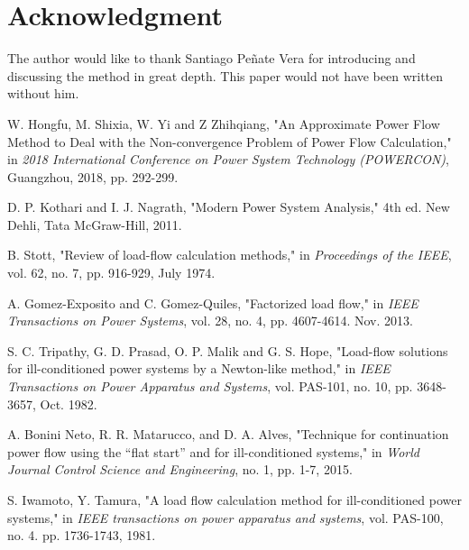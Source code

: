 \documentclass[journal]{IEEEtran}
\begin{document}
\section*{Acknowledgment}
The author would like to thank Santiago Peñate Vera for introducing and discussing the method in great depth. This paper would not have been written without him.



\begin{thebibliography}{31}

W. Hongfu, M. Shixia, W. Yi and Z Zhihqiang, "An Approximate Power Flow Method to Deal with the Non-convergence Problem of Power Flow Calculation," in \emph{2018 International Conference on Power System Technology (POWERCON)}, Guangzhou, 2018, pp. 292-299.

D. P. Kothari and I. J. Nagrath, "Modern Power System Analysis," 4th ed. New Dehli, Tata McGraw-Hill, 2011.

B. Stott, "Review of load-flow calculation methods," in \emph{Proceedings of the IEEE}, vol. 62, no. 7, pp. 916-929, July 1974. 


A. Gomez-Exposito and C. Gomez-Quiles, "Factorized load flow," in \emph{IEEE Transactions on Power Systems}, vol. 28, no. 4, pp. 4607-4614. Nov. 2013.

S. C. Tripathy, G. D. Prasad, O. P. Malik and G. S. Hope, "Load-flow solutions for ill-conditioned power systems by a Newton-like method," in \emph{IEEE Transactions on Power Apparatus and Systems}, vol. PAS-101, no. 10, pp. 3648-3657, Oct. 1982.

A. Bonini Neto, R. R. Matarucco, and D. A. Alves, "Technique for continuation power flow using the “flat start” and for ill-conditioned systems," in \emph{World Journal Control Science and Engineering}, no. 1, pp. 1-7, 2015.

S. Iwamoto, Y. Tamura, "A load flow calculation method for ill-conditioned power systems," in \emph{IEEE transactions on power apparatus and systems}, vol. PAS-100, no. 4. pp. 1736-1743, 1981.


\end{thebibliography}
\end{document}
